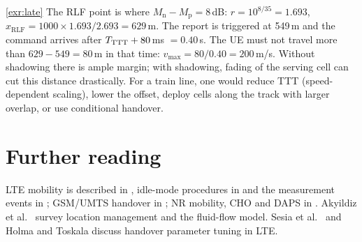 \documentclass[11pt,a4paper]{article}
\begin{document}
\begin{solutionbox}{\ref{exr:late}}
The RLF point is where $M_\mathrm{n}-M_\mathrm{p} = 8$\,dB: $r = 10^{8/35} = 1.693$,
$x_{\mathrm{RLF}} = 1000\times1.693/2.693 = 629$\,m. The report is triggered at 549\,m and the command
arrives after $T_{\mathrm{TTT}} + 80$\,ms $= 0.40$\,s. The UE must not travel more than $629-549 = 80$\,m in that
time: $v_{\max} = 80/0.40 = 200$\,m/s. Without shadowing there is ample margin; with shadowing,
fading of the serving cell can cut this distance drastically. For a train line, one would reduce
TTT (speed-dependent scaling), lower the offset, deploy cells along the track with larger overlap,
or use conditional handover.
\end{solutionbox}

\section{Further reading}
LTE mobility is described in \cite{ts36300}, idle-mode procedures in \cite{ts36304} and the
measurement events in \cite{ts36331}; GSM/UMTS handover in \cite{ts23009}; NR mobility, CHO and DAPS
in \cite{ts38300}. Akyildiz et al.\ \cite{akyildiz1999mobility} survey location management and the
fluid-flow model. Sesia et al.\ \cite{sesia2011lte} and Holma and Toskala \cite{holma2011lte}
discuss handover parameter tuning in LTE.

\printbibliography[heading=subbibliography,title={\ACNstrRefs}]
\end{document}
